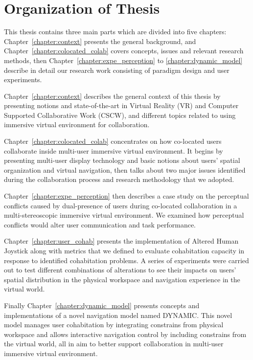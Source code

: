 \section*{Organization of Thesis}
This thesis contains three main parts which are divided into five chapters: Chapter~\ref{chapter:context} presents the general background, and Chapter~\ref{chapter:colocated_colab} covers concepts, issues and relevant research methods, then Chapter~\ref{chapter:expe_perception} to \ref{chapter:dynamic_model} describe in detail our research work consisting of paradigm design and user experiments.

Chapter~\ref{chapter:context} describes the general context of this thesis by presenting notions and state-of-the-art in Virtual Reality (VR) and Computer Supported Collaborative Work (CSCW), and different topics related to using immersive virtual environment for collaboration.

Chapter~\ref{chapter:colocated_colab} concentrates on how co-located users collaborate inside multi-user immersive virtual environment. It begins by presenting multi-user display technology and basic notions about users' spatial organization and virtual navigation, then talks about two major issues identified during the collaboration process and research methodology that we adopted. 

Chapter~\ref{chapter:expe_perception} then describes a case study on the perceptual conflicts caused by dual-presence of users during co-located collaboration in a multi-stereoscopic immersive virtual environment. We examined how perceptual conflicts would alter user communication and task performance.

Chapter~\ref{chapter:user_cohab} presents the implementation of Altered Human Joystick along with metrics that we defined to evaluate cohabitation capacity in response to identified cohabitation problems. A series of experiments were carried out to test different combinations of alterations to see their impacts on users' spatial distribution in the physical workspace and navigation experience in the virtual world.

Finally Chapter~\ref{chapter:dynamic_model} presents concepts and implementations of a novel navigation model named DYNAMIC. This novel model manages user cohabitation by integrating constrains from physical workspace and allows interactive navigation control by including constrains from the virtual world, all in aim to better support collaboration in multi-user immersive virtual environment.